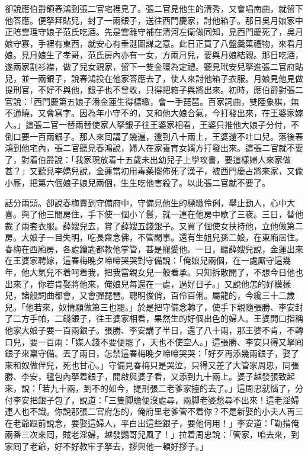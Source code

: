 卻說應伯爵領春鴻到張二官宅裡見了。張二官見他生的清秀，又會唱南曲，就留下他答應。便拏拜貼兒，封了一兩銀子，送往西門慶家，討他箱子。那日吳月娘家中正陪雲理守娘子范氏吃酒。先是雲離守補在清河左衛做同知，見西門慶死了，吳月娘守寡，手裡有東西，就安心有垂涎圖謀之意。{}此日正買了八盤羹菓禮物，來看月娘。見月娘生了孝哥，范氏房內亦有一女，方兩月兒，要與月娘結親。那日吃酒，遂兩家割衫襟，做了兒女親家，留下一雙金環為定禮。聽見玳安兒拏進張二官府貼兒，並一兩銀子，說春鴻投在他家答應去了，使人來討他箱子衣服。月娘見他見做提刑官，不好不與他，銀子也不曾收，只得把箱子與將出來。初時，應伯爵對張二官說：「西門慶第五娘子潘金蓮生得標緻，會一手琵琶。百家詞曲，雙陸象棋，無不通曉，又會寫字。因為年小守不的，又和他大娘合氣，今打發出來，在王婆家嫁人。」這張二官一替兩替使家人拏銀子往王婆家相看，王婆只推他大娘子分付，不倒口要一百兩銀子。那人來囘講了幾遍，還到八十兩上，王婆還不吐口兒。落後春鴻到他宅內，張二官聽見春鴻說，婦人在家養育女婿方打發出來。這張二官就不要了，對着伯爵說：「我家現放着十五歲未出幼兒子上學攻書，要這樣婦人來家做甚？」又聽見李嬌兒說，{}金蓮當初用毒藥擺佈死了漢子，被西門慶占將來家，又偸小厮，把第六個娘子娘兒兩個，生生吃他害殺了。以此張二官就不要了。

話分兩頭。卻說春梅賣到守備府中，守備見他生的標緻伶俐，舉止動人，心中大喜。與了他三間房住，手下使一個小丫鬟，就一連在他房中歇了三夜。三日，替他裁了兩套衣服。薛嫂兒去，賞了薛嫂五錢銀子。又買了個使女扶持他，立他做第二房。大娘子一目失明，吃長齋念佛，不管閑事。還有生姐兒孫二娘，在東廂居住。春梅在西廂房，各處鑰匙都教他掌管，甚是寵愛他。一日，聽薛嫂兒說，金蓮出來在王婆家聘嫁，這春梅晚夕啼啼哭哭對守備說：「俺娘兒兩個，在一處厮守這幾年，他大氣兒不着呵着我，把我當親女兒一般看承。只知拆散開了，不想今日他也出來了，你若肯娶將他來，俺娘兒每還在一處，過好日子。」又說他怎的好模樣兒，諸般詞曲都會，又會彈琵琶。聰明俊俏，百伶百俐。屬龍的，今纔三十二歲兒。「他若來，奴情願做第三也罷。」{}於是把守備念轉了，使手下親隨張勝、李安封了二方手帕，二錢銀子，往王婆家相看，果然生的好個出色的婦人。王婆開口指稱他家大娘子要一百兩銀子。張勝、李安講了半日，還了八十兩，那王婆不肯，不轉口兒，要一百兩：「媒人錢不要便罷了，天也不使空人。」{}這張勝、李安只得又拏囘銀子來稟守備。丟了兩日，怎禁這春梅晚夕啼啼哭哭：「好歹再添幾兩銀子，娶了來和奴做伴兒，死也甘心。」守備見春梅只是哭泣，只得又差了大管家周忠，同張勝、李安，氊包內拏着銀子，開啟與婆子看，又添到九十兩上。婆子越發張致起來，說：「若九十兩，到不的如今，提刑張二老爹家擡的去了。」這周忠就惱了，分付李安把銀子包了，說道：「三隻脚蟾便沒處尋，兩脚老婆愁尋不出來！這老淫婦連人也不識。你說那張二官府怎的，俺府里老爹管不着你？不是新娶的小夫人再三在老爺跟前說念，要娶這婦人，平白出這些銀子，要他何用！」李安道：「勒掯俺兩番三次來囘，賊老淫婦，越發鸚哥兒風了！」拉着周忠說：「管家，咱去來，到家囘了老爺，好不好教牢子拏去，拶與他一頓好拶子。」

